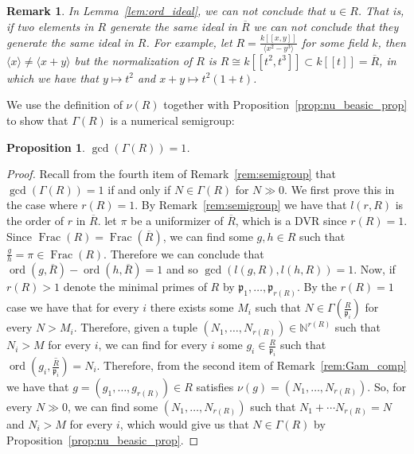 \documentclass{article}
\newtheorem{proposition}[theorem]{Proposition}
\newtheorem{remark}[theorem]{Remark}
\DeclareMathOperator{\ord}{ord}
\DeclareMathOperator{\Frac}{Frac}
\numberwithin{theorem}{section}
\begin{document}
\begin{remark}
    \textup{In Lemma~\ref{lem:ord_ideal}, we can not conclude that $u\in R$. That is, if two elements in $R$ generate the same ideal in $\overline{R}$ we can not conclude that they generate the same ideal in $R$. For example, let $R=\frac{k[[x,y]]}{\langle x^2 - y^3 \rangle}$ for some field $k$, then $\langle x \rangle \neq \langle x+y\rangle$ but the normalization of $R$ is $R \cong k[[t^2, t^3]] \subset k[[t]] = \overline{R}$, in which we have that $y \mapsto t^2$ and $x+y \mapsto t^2(1+t)$. }
\end{remark}


We use the definition of $\nu(R)$ together with Proposition~\ref{prop:nu_beasic_prop} to show that $\Gamma(R)$ is a numerical semigroup:

\begin{proposition}\label{prop:semigrp}
    $\gcd(\Gamma(R))=1$.
\end{proposition}

\begin{proof}
    Recall from the fourth item of Remark~\ref{rem:semigroup} that $\gcd(\Gamma(R))=1$ if and only if $N\in \Gamma(R)$ for $N\gg0$. We first prove this in the case where $r(R)=1$. By Remark~\ref{rem:semigroup} we have that $l(r,R)$ is the order of $r$ in $\overline{R}$. let $\pi$ be a uniformizer of $\overline{R}$, which is a DVR since $r(R)=1$. Since $\Frac(R)=\Frac(\overline{R})$, we can find some $g,h \in R$ such that $\frac{g}{h}=\pi \in \Frac(R)$. Therefore we can conclude that $\ord(g, \overline{R})-\ord(h,\overline{R})=1$ and so $\gcd(l(g,R), l(h,R))=1$. Now, if $r(R)>1$ denote the minimal primes of $R$ by $\mathfrak{p}_1, \dots, \mathfrak{p}_{r(R)}$. By the $r(R)=1$ case
    we have that for every $i$ there exists some $M_i$ such that $N \in \Gamma\left(\frac{R}{\mathfrak{p}_i}\right)$ for every $N > M_i$. Therefore, given a tuple $(N_1, \dots, N_{r(R)}) \in \mathbb{N}^{r(R)}$ such that $N_i > M$ for every $i$, we can find for every $i$ some $g_i \in \frac{R}{\mathfrak{p}_i}$ such that $\ord\left(g_i, \overline{\frac{R}{\mathfrak{p}_i}}\right)=N_i$. Therefore, from the second item of Remark~\ref{rem:Gam_comp} we have that $g=(g_1, \dots, g_{r(R)}) \in R$ satisfies $\nu(g) = (N_1, \dots, N_{r(R)})$. So, for every $N \gg 0$, we can find some $(N_1, \dots, N_{r(R)})$ such that $N_1 + \cdots N_{r(R)}=N$ and $N_i > M$ for every $i$, which would give us that $N \in \Gamma(R)$ by Proposition~\ref{prop:nu_beasic_prop}. 
\end{proof}
\end{document}
